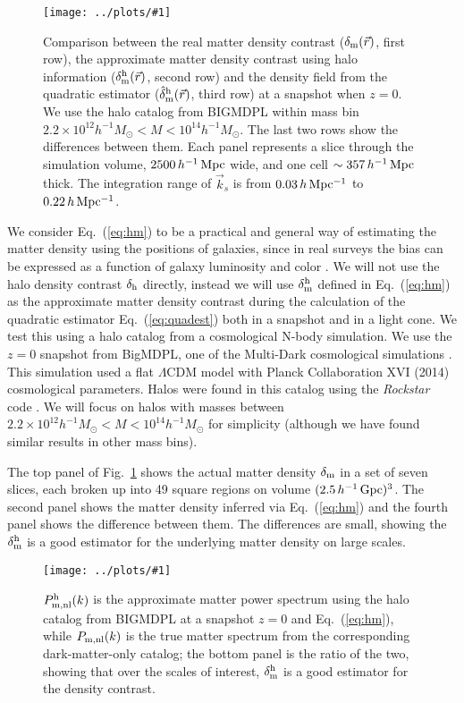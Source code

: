 \documentclass[prd,amsmath,amssymb,floatfix,superscriptaddress,nofootinbib,twocolumn]{revtex4-1}
\newcommand{\vrr}{\vec{r}}
\newcommand{\vk}{\vec{k}}
\newcommand{\ec}[1]{Eq.~(\ref{eq:#1})}
\newcommand{\rf}[1]{\ref{fig:#1}}
\newcommand{\sfig}[2]{
\texttt{[image: ../plots/\#1]}
        }
\newcommand{\Sfig}[2]{
   \begin{figure}[thbp]
   \begin{center}
    \sfig{../plots/#1.pdf}{\columnwidth}
    \caption{{\small #2}}
    \label{fig:#1}
     \end{center}
   \end{figure}
}
\newcommand\dmh{\delta_{\rm m}^{\rm h}}
\newcommand\hdmh{\hat{\delta}_{\rm m}^{\rm h}}
\begin{document}
\Sfig{real_snap}{Comparison between the real matter density contrast ($\delta_{\rm m}(\vrr)$, first row), the approximate matter density contrast using halo information ($\dmh(\vrr)$, second row) and the density field from the quadratic estimator ($\hdmh(\vrr)$, third row) at a snapshot when $z=0$. We use the halo catalog from BIGMDPL within mass bin $2.2 \times 10^{12}h^{-1}M_{\odot}<M < 10^{14}h^{-1}M_{\odot}$. The last two rows show the differences between them. Each panel represents a slice through the simulation volume, $2500\,h^{-1}\rm \, Mpc$ wide, and one cell $\sim 357\,h^{-1}\rm \, Mpc$ thick. The integration range of $\vk_{s}$ is from $0.03\, h \rm \, Mpc^{-1}$ to $0.22\, h \rm \, Mpc^{-1}$.}

We consider \ec{hm} to be a practical and general way of estimating the matter density using the positions of galaxies, since in real surveys the bias can be expressed as a function of galaxy luminosity and color \cite{Cresswell:2008Col}. We will not use the halo density contrast $\delta_{\rm h}$ directly, instead we will use $\dmh$ defined in \ec{hm} as the approximate matter density contrast during the calculation of the quadratic estimator \ec{quadest} both in a snapshot and in a light cone.
We test this using a halo catalog from a cosmological N-body simulation. We use the $z=0$ snapshot from BigMDPL, one of the Multi-Dark cosmological simulations \cite{Klypin:2014nov}. This simulation used a flat $\Lambda$CDM model with Planck Collaboration XVI (2014) \cite{Planck:2014cos} cosmological parameters. Halos were found in this catalog using the \textit{Rockstar} code \cite{Behroozi:2013Rock}. We will focus on halos with masses between $2.2 \times 10^{12}h^{-1}M_{\odot}<M < 10^{14}h^{-1}M_{\odot}$ for simplicity (although we have found similar results in other mass bins).

The top panel of Fig.~\rf{real_snap} shows the actual matter density $\delta_{\rm m}$ in a set of seven slices, each broken up into 49 square regions on volume $(2.5\, h^{-1}\rm\, Gpc)^3$. The second panel shows the matter density inferred via \ec{hm} and the fourth panel shows the difference between them. The differences are small, showing the $\dmh$ is a good estimator for the underlying matter density on large scales.

\Sfig{hm}{$ P^{\rm h}_{\rm m,nl}(k)$ is the approximate matter power spectrum using the halo catalog from BIGMDPL at a snapshot $z=0$ and \ec{hm}, while $ P_{\rm m,nl}(k)$ is the true matter spectrum from the corresponding dark-matter-only catalog; the bottom panel is the ratio of the two, showing that over the scales of interest, $\dmh$ is a good estimator for the density contrast.}
\end{document}
